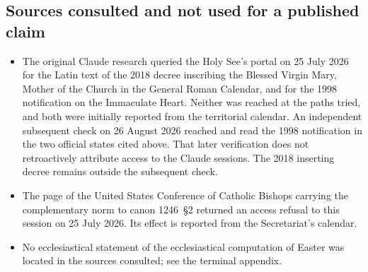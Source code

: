 \subsection{Sources consulted and not used for a published claim}

\begin{itemize}
\item The original Claude research queried the Holy See's portal on 25 July 2026 for the Latin text
of the 2018 decree inscribing the Blessed Virgin Mary, Mother of the Church in the General Roman
Calendar, and for the 1998 notification on the Immaculate Heart. Neither was reached at the paths
tried, and both were initially reported from the territorial calendar. An independent subsequent
check on 26 August 2026 reached and read the 1998 notification in the two official states cited
above. That later verification does not retroactively attribute access to the Claude sessions. The
2018 inserting decree remains outside the subsequent check.
\item The page of the United States Conference of Catholic Bishops carrying the complementary norm to
canon 1246~\S2 returned an access refusal to this session on 25 July 2026. Its effect is reported
from the Secretariat's calendar.
\item No ecclesiastical statement of the ecclesiastical computation of Easter was located in the
sources consulted; see the terminal appendix.
\end{itemize}
